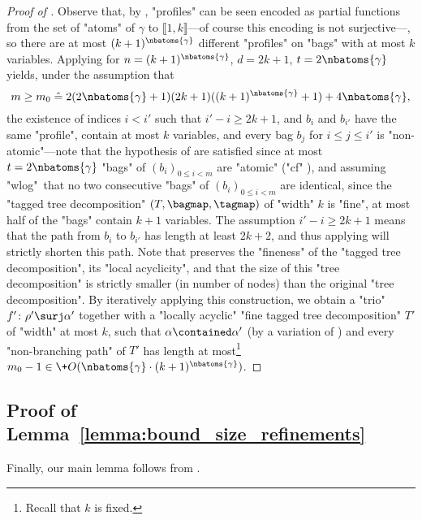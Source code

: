 \begin{proof}[Proof of ]
    Observe that, by ,
	"profiles" can be seen encoded as partial functions from the set of "atoms" of $\gamma$ to $\lBrack 1,k\rBrack$---of course this encoding is not surjective---, so
	there are at most $(k+1)^{\nbatoms{\gamma}}$ different "profiles" on "bags" with at most $k$ variables.
    Applying  for $n = (k+1)^{\nbatoms{\gamma}}$, $d = 2k+1$, $t = 2\nbatoms{\gamma}$ yields, under the assumption that
    \[
        m \geq m_0 \defeq 2(2\nbatoms{\gamma}+1)(2k+1)((k+1)^{\nbatoms{\gamma}}+1)
		+ 4\nbatoms{\gamma},
    \]
    the existence of indices $i < i'$ such that $i' - i \geq 2k+1$,
    and $b_i$ and $b_{i'}$ have the same "profile", contain at most $k$ variables,
    and every bag $b_j$ for $i \leq j \leq i'$ is "non-atomic"---note that the hypothesis
    of  are satisfied since at most $t = 2\nbatoms{\gamma}$
    "bags" of $(b_i)_{0 \leq i < m}$ are "atomic" ("cf" ), and assuming "wlog"~that
    no two consecutive "bags" of $(b_i)_{0 \leq i < m}$ are identical, since the "tagged tree decomposition" $(T, \bagmap, \tagmap)$ of "width" $k$ is "fine", at most half of the 
    "bags" contain $k+1$ variables.
    The assumption $i' - i \geq 2k+1$ means that the path from $b_i$ to $b_{i'}$ has
    length at least $2k+2$, and thus applying  will
    strictly shorten this path.
    Note that  preserves the "fineness" of the "tagged 
    tree decomposition", its "local acyclicity", and that the size of
    this "tree decomposition" is strictly smaller (in number of nodes) than
    the original "tree decomposition". By iteratively applying this construction,
    we obtain a "trio" $\fun'\colon \rho' \surj \alpha'$ together with a "locally acyclic"
    "fine tagged tree decomposition" $T'$
    of "width" at most $k$, such that $\alpha \contained \alpha'$ (by a variation of
	)
    and every "non-branching path" of $T'$ has length at most\footnote{Recall that $k$
	is fixed.} 
    $m_0 - 1 \in 
    \+O(\nbatoms{\gamma}\cdot (k+1)^{\nbatoms{\gamma}})$.
\end{proof}

\subsection{\AP{}Proof of Lemma~\ref{lemma:bound_size_refinements}}
\label{sec:proof-bound-size-refinements}

Finally, our main lemma follows from
.

